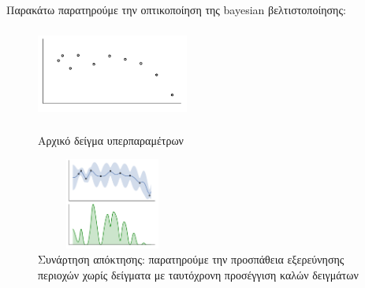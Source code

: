 \documentclass{article}
\begin{document}
Παρακάτω παρατηρούμε την οπτικοποίηση της bayesian βελτιστοποίησης:
\begin{figure}[H]
\begin{minipage}[c][11cm][t]{.5\textwidth}
  \vspace*{\fill}
  \centering
  \includegraphics[width=5cm,height=3cm]{sample.png}
  \caption[Αρχικό δείγμα υπερπαραμέτρων]{Αρχικό δείγμα υπερπαραμέτρων}
 \label{fig:test2}\par\vfill
  \includegraphics[width=5cm,height=3cm]{explore.png}
  \caption[Συνάρτηση απόκτησης]{Συνάρτηση απόκτησης: παρατηρούμε την προσπάθεια εξερεύνησης περιοχών χωρίς δείγματα με ταυτόχρονη προσέγγιση καλών δειγμάτων}
  

\end{minipage}
\end{figure}
\end{document}
